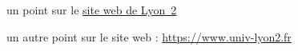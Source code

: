  \item un point sur le \href{https://www.univ-lyon2.fr}{site web de Lyon~2}
  \item un autre point sur le site web : \url{https://www.univ-lyon2.fr}
